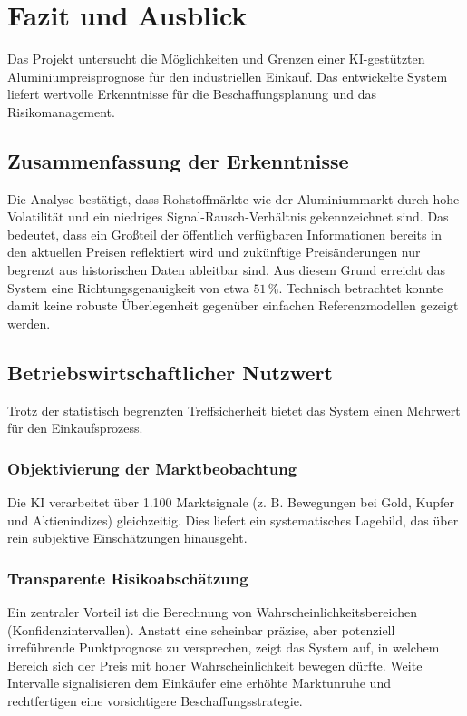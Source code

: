 \section{Fazit und Ausblick}
\label{sec:fazit}

Das Projekt untersucht die Möglichkeiten und Grenzen einer KI-gestützten Aluminiumpreisprognose für den industriellen Einkauf. Das entwickelte System liefert wertvolle Erkenntnisse für die Beschaffungsplanung und das Risikomanagement.

\subsection{Zusammenfassung der Erkenntnisse}
Die Analyse bestätigt, dass Rohstoffmärkte wie der Aluminiummarkt durch hohe Volatilität und ein niedriges Signal-Rausch-Verhältnis gekennzeichnet sind. Das bedeutet, dass ein Großteil der öffentlich verfügbaren Informationen bereits in den aktuellen Preisen reflektiert wird und zukünftige Preisänderungen nur begrenzt aus historischen Daten ableitbar sind. Aus diesem Grund erreicht das System eine Richtungsgenauigkeit von etwa $51\,\%$. Technisch betrachtet konnte damit keine robuste Überlegenheit gegenüber einfachen Referenzmodellen gezeigt werden.

\subsection{Betriebswirtschaftlicher Nutzwert}
Trotz der statistisch begrenzten Treffsicherheit bietet das System einen Mehrwert für den Einkaufsprozess.

\subsubsection{Objektivierung der Marktbeobachtung}
Die KI verarbeitet über 1.100 Marktsignale (z. B. Bewegungen bei Gold, Kupfer und Aktienindizes) gleichzeitig. Dies liefert ein systematisches Lagebild, das über rein subjektive Einschätzungen hinausgeht.

\subsubsection{Transparente Risikoabschätzung}
Ein zentraler Vorteil ist die Berechnung von Wahrscheinlichkeitsbereichen (Konfidenzintervallen). Anstatt eine scheinbar präzise, aber potenziell irreführende Punktprognose zu versprechen, zeigt das System auf, in welchem Bereich sich der Preis mit hoher Wahrscheinlichkeit bewegen dürfte. Weite Intervalle signalisieren dem Einkäufer eine erhöhte Marktunruhe und rechtfertigen eine vorsichtigere Beschaffungsstrategie.

